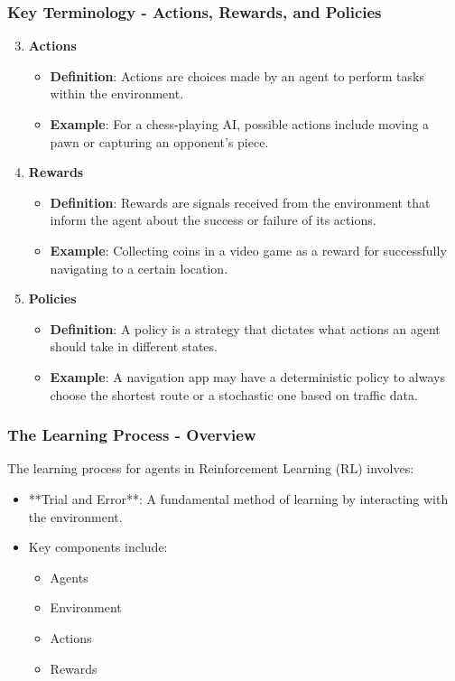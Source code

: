 \documentclass[aspectratio=169]{beamer}
\begin{document}
\begin{frame}[fragile]
    \frametitle{Key Terminology - Actions, Rewards, and Policies}
    \begin{enumerate}
        \setcounter{enumi}{2} %
        \item \textbf{Actions}
        \begin{itemize}
            \item \textbf{Definition}: Actions are choices made by an agent to perform tasks within the environment.
            \item \textbf{Example}: For a chess-playing AI, possible actions include moving a pawn or capturing an opponent's piece.
        \end{itemize}
        
        \item \textbf{Rewards}
        \begin{itemize}
            \item \textbf{Definition}: Rewards are signals received from the environment that inform the agent about the success or failure of its actions.
            \item \textbf{Example}: Collecting coins in a video game as a reward for successfully navigating to a certain location.
        \end{itemize}
        
        \item \textbf{Policies}
        \begin{itemize}
            \item \textbf{Definition}: A policy is a strategy that dictates what actions an agent should take in different states.
            \item \textbf{Example}: A navigation app may have a deterministic policy to always choose the shortest route or a stochastic one based on traffic data.
        \end{itemize}
    \end{enumerate}
\end{frame}

\begin{frame}[fragile]
    \frametitle{The Learning Process - Overview}
    The learning process for agents in Reinforcement Learning (RL) involves:
    \begin{itemize}
        \item **Trial and Error**: A fundamental method of learning by interacting with the environment.
        \item Key components include:
        \begin{itemize}
            \item Agents
            \item Environment
            \item Actions
            \item Rewards
        \end{itemize}
    \end{itemize}
\end{frame}
\end{document}
